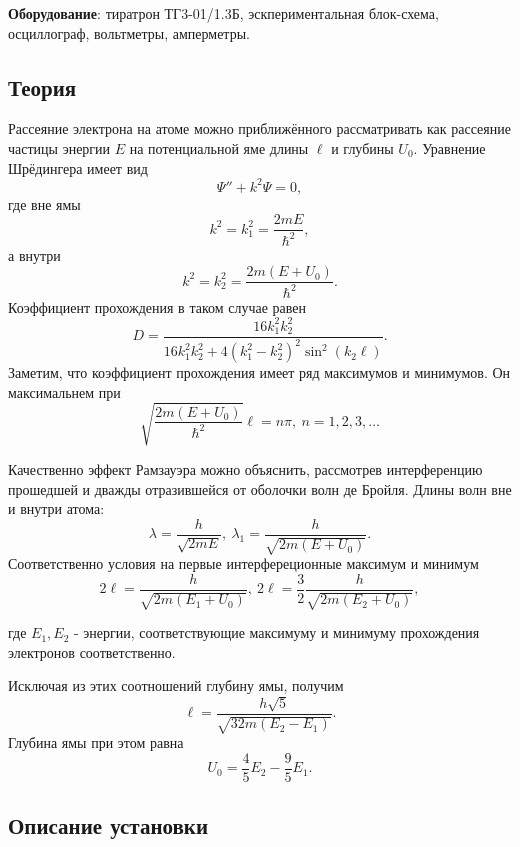 \documentclass[a4paper, 12pt]{article}%
\begin{document}
\textbf{Оборудование}: тиратрон ТГ3-01/1.3Б, эскпериментальная блок-схема, осциллограф, вольтметры, амперметры.

\subsection{Теория}
Рассеяние электрона на атоме можно приближённого рассматривать как рассеяние частицы энергии $E$ на потенциальной яме длины $\ell$ и глубины $U_0$. Уравнение Шрёдингера имеет вид
\[\Psi'' + k^2 \Psi = 0,\]
где вне ямы 
\[k^2 = k_1^2 = \dfrac{2mE}{\hbar^2},\]
а внутри 
\[k^2 = k_2^2 = \dfrac{2m(E+U_0)}{\hbar^2}.\]
Коэффициент прохождения в таком случае равен
\[D = \dfrac{16 k_1^2 k_2^2}{16k_1^2 k_2^2 + 4(k_1^2 - k_2^2)^2\sin^2(k_2\ell)}.\]
Заметим, что коэффициент прохождения имеет ряд максимумов и минимумов. Он максимальнем при
\begin{equation}\label{0}
\sqrt{\dfrac{2m(E+U_0)}{\hbar^2}}\ell = n\pi,~n=1,2,3,\dots
\end{equation}

Качественно эффект Рамзауэра можно объяснить, рассмотрев интерференцию прошедшей и дважды отразившейся от оболочки волн де Бройля. Длины волн вне и внутри атома:
\[\lambda = \dfrac{h}{\sqrt{2mE}},~\lambda_1 = \dfrac{h}{\sqrt{2m(E+U_0)}}.\]
Соответственно условия на первые интерфереционные максимум и минимум 
\begin{equation}\label{1}
2\ell = \dfrac{h}{\sqrt{2m(E_1 + U_0)}},~2\ell = \dfrac{3}{2}\dfrac{h}{\sqrt{2m(E_2 + U_0)}},
\end{equation}

где $E_1, E_2$ - энергии, соответствующие максимуму и минимуму прохождения электронов соответственно.


Исключая из этих соотношений глубину ямы, получим
\begin{equation}\label{2}
\ell = \dfrac{h\sqrt{5}}{\sqrt{32m(E_2 - E_1)}}.
\end{equation}
Глубина ямы при этом равна
\begin{equation}\label{4}
U_0 = \dfrac{4}{5}E_2 - \dfrac{9}{5}E_1.
\end{equation}
\subsection{Описание установки}
\end{document}
